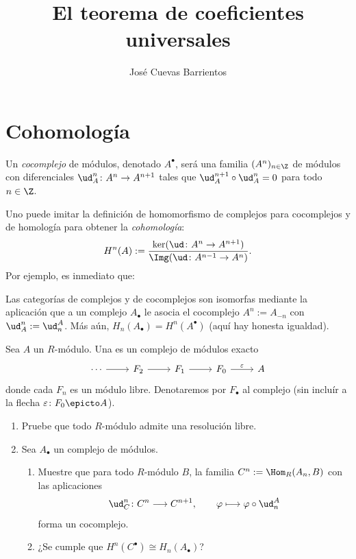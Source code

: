 \documentclass[11pt, reqno]{amsart}
\title{El teorema de coeficientes universales}
\date{\DTMdate{2026-08-20}}
\author{José Cuevas Barrientos}
\begin{document}
\maketitle

\section{Cohomología}
\begin{mydef}
	Un \emph{cocomplejo} de módulos, denotado $A^\bullet$, será una familia $(A^n)_{n\in\Z}$ de módulos con diferenciales $\ud^n_A \colon
	A^n \to A^{n+1}$  tales que $\ud_A^{n+1}\circ\ud_A^n = 0$ para todo $n \in \Z$.
\end{mydef}
Uno puede imitar la definición de homomorfismo de complejos para cocomplejos y de homología para obtener la \emph{cohomología}:
\[
	H^n(A) := \frac{\ker( \ud \colon A^n \to A^{n+1} )}{\Img( \ud \colon A^{n-1} \to A^n )}.
\]
Por ejemplo, es inmediato que:
\begin{obs}
	Las categorías de complejos y de cocomplejos son isomorfas mediante la aplicación que a un complejo $A_\bullet$ le asocia el
	cocomplejo $A^n := A_{-n}$ con $\ud^n_A := \ud^A_n$.
	Más aún, $H_n(A_\bullet) = H^n(A^\bullet)$ (aquí hay honesta igualdad).
\end{obs}

\begin{mydef}
	Sea $A$ un $R$-módulo.
	Una  es un complejo de módulos exacto
	\[\begin{tikzcd}
		\cdots \rar & F_2 \rar & F_1 \rar & F_0 \rar["\varepsilon"] & A
	\end{tikzcd}\]
	donde cada $F_n$ es un módulo libre.
	Denotaremos por $F_\bullet$ al complejo (sin incluír a la flecha $\varepsilon \colon F_0 \epicto A$).
\end{mydef}

\begin{enumerate}
	\item\lookright
		Pruebe que todo $R$-módulo admite una resolución libre.

	\item Sea $A_\bullet$ un complejo de módulos.
		\begin{enumerate}
			\item Muestre que para todo $R$-módulo $B$, la familia $C^n := \Hom_R(A_n, B)$ con las aplicaciones
				\[
					\ud^n_C \colon C^n \longrightarrow C^{n+1}, \qquad \varphi \longmapsto \varphi\circ\ud^A_n
				\]
				forma un cocomplejo.

			\item\lookup ¿Se cumple que $H^n(C^\bullet) \cong H_n(A_\bullet)$?
		\end{enumerate}
\end{enumerate}
\end{document}
